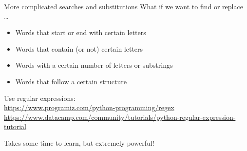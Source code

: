 \documentclass[aspectratio=169,usenames,dvipsnames]{beamer}
\begin{document}
%
%
%

\begin{frame}{More complicated searches and substitutions}
What if we want to find or replace \dots
\begin{itemize}
    \item Words that start or end with certain letters
    \item Words that contain (or not) certain letters
    \item Words with a certain number of letters or substrings
    \item Words that follow a certain structure
\end{itemize}

Use regular expressions:\\
\url{https://www.programiz.com/python-programming/regex} \\
\url{https://www.datacamp.com/community/tutorials/python-regular-expression-tutorial}

Takes some time to learn, but extremely powerful!
\end{frame}
\end{document}
